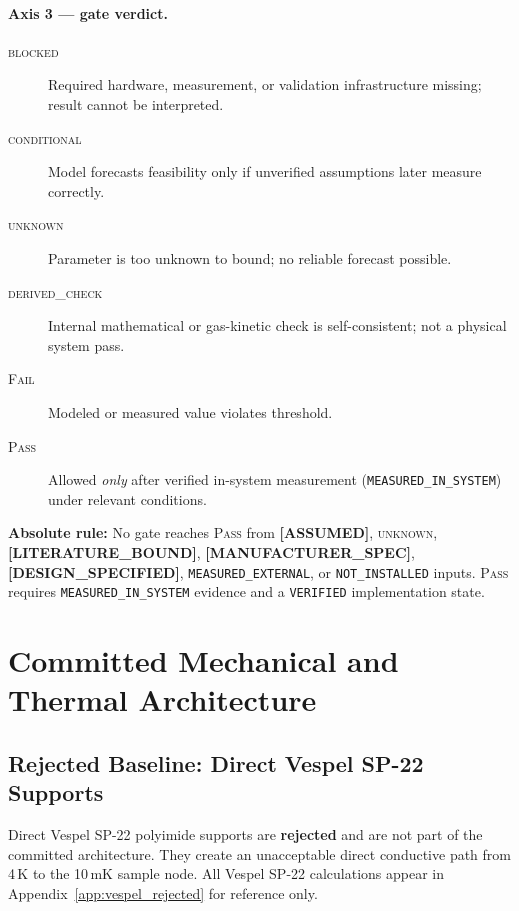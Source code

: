 \documentclass[12pt,a4paper]{article}
\newcommand{\blocked}{\textsc{blocked}}
\newcommand{\conditional}{\textsc{conditional}}
\newcommand{\derivedcheck}{\textsc{derived\_check}}
\newcommand{\unknown}{\textsc{unknown}}
\newcommand{\assumed}{\textbf{[ASSUMED]}}
\newcommand{\designspec}{\textbf{[DESIGN\_SPECIFIED]}}
\newcommand{\mfrspec}{\textbf{[MANUFACTURER\_SPEC]}}
\newcommand{\litbound}{\textbf{[LITERATURE\_BOUND]}}
\begin{document}
\paragraph{Axis 3 --- gate verdict.}
\begin{description}
  \item[\blocked{}] Required hardware, measurement, or validation infrastructure missing; result cannot be interpreted.
  \item[\conditional{}] Model forecasts feasibility only if unverified assumptions later measure correctly.
  \item[\unknown{}] Parameter is too unknown to bound; no reliable forecast possible.
  \item[\derivedcheck{}] Internal mathematical or gas-kinetic check is self-consistent; not a physical system pass.
  \item[\textsc{Fail}] Modeled or measured value violates threshold.
  \item[\textsc{Pass}] Allowed \emph{only} after verified in-system measurement (\texttt{MEASURED\_IN\_SYSTEM}) under relevant conditions.
\end{description}

\textbf{Absolute rule:} No gate reaches \textsc{Pass} from \assumed{},
\unknown{}, \litbound{}, \mfrspec{}, \designspec{}, \texttt{MEASURED\_EXTERNAL}, or
\texttt{NOT\_INSTALLED} inputs. \textsc{Pass} requires \texttt{MEASURED\_IN\_SYSTEM}
evidence and a \texttt{VERIFIED} implementation state.

\section{Committed Mechanical and Thermal Architecture}
\label{sec:support}

\subsection{Rejected Baseline: Direct Vespel SP-22 Supports}

Direct Vespel SP-22 polyimide supports are \textbf{rejected} and are not part
of the committed architecture.
They create an unacceptable direct conductive path from 4\,K to the 10\,mK
sample node.
All Vespel SP-22 calculations appear in Appendix~\ref{app:vespel_rejected}
for reference only.
\end{document}
